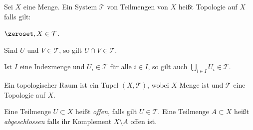 \begin{definition}\label{topologie}
    Sei \( X \) eine Menge. Ein System \( \mathcal{T} \) von Teilmengen von \( X \) heißt Topologie auf \( X \) falls gilt: 
    \begin{eigenschaftenenumeration}
        
        \item\label{topologie:grundmengen} \( \zeroset,X\in \mathcal{T} \).
        \item\label{topologie:endlicher_schnitt} Sind \( U \) und \( V\in \mathcal{T} \), so gilt \( U\cap V \in \mathcal{T}\).
        \item\label{topologie:unendliche_vereinigung} Ist \( I \) eine Indexmenge und \( U_i \in \mathcal{T}  \) für alle \( i\in I \), so gilt auch \( \bigcup_{i\in I}U_i\in \mathcal{T} \).
    \end{eigenschaftenenumeration}
    
\end{definition}
\begin{notation}
    Ein topologischer Raum ist ein Tupel \( (X,\mathcal{T}) \), wobei \(X\) Menge ist und \( \mathcal{T} \) eine Topologie auf \(X\).

    Eine Teilmenge \( U \subset X \) heißt \emph{offen}, falls gilt \(U \in \mathcal{T}\).
    Eine Teilmenge \(A \subset X\) heißt \emph{abgeschlossen} falls ihr Komplement \(X \setminus A\) offen ist.
        
    
\end{notation}
